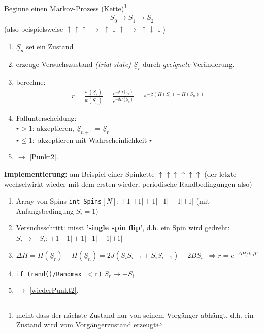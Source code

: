 \documentclass[12pt]{article}
\begin{document}
Beginne einen Markov-Prozess (Kette)\footnote{meint dass der nächste Zustand nur von seinem Vorgänger abhängt, d.h. ein Zustand wird vom Vorgängerzustand erzeugt} 
\begin{align*}
\underline{S}_0 \rightarrow \underline{S}_1 \rightarrow \underline{S}_2
\end{align*}
(also beispielsweise $\uparrow \uparrow \uparrow \; \rightarrow \; \uparrow \downarrow \uparrow \; \rightarrow \; \uparrow \downarrow \downarrow$)

\begin{enumerate}
\item $\underline{S}_n $ sei ein Zustand
\item \label{Punkt2} erzeuge Versuchszustand \textit{(trial state)} $\underline{S}_r$ durch \textit{geeignete} Veränderung.
\item berechne: 
\begin{align}
r= \frac{w(\underline{S}_r)}{w(\underline{S}_n)} = \frac{e^{- \beta H(\underline{S}_r )}}{e^{- \beta H(\underline{S}_n )}}= e^{-\beta (H(S_r)-H(S_n))}
\end{align}

\item Fallunterscheidung: \\ 
$r>1$: akzeptieren, $\underline{S}_{n+1} = \underline{S}_r$\\
$r \leq 1:$ akzeptieren mit Wahrscheinlichkeit $r$
\item  $\rightarrow$ \ref{Punkt2}.
\end{enumerate}
\textbf{Implementierung:} am Beispiel einer Spinkette $\uparrow \uparrow \uparrow \uparrow \uparrow \uparrow$ (der letzte wechselwirkt wieder mit dem ersten wieder, periodische Randbedingungen also)

\begin{enumerate}
\item Array von Spins \texttt{int Spins}$[N]$: $ +1|+1|+1|+1|+1|+1|$ (mit Anfangsbedingung $S_i =1$)
\item \label{wiederPunkt2} Versuchsschritt: misst \textbf{'single spin flip'}, d.h. ein Spin wird gedreht: \\
$S_i \rightarrow - S_i$: $ +1|-1|+1|+1|+1|+1|$
\item $\Delta H= H(\underline{S}_r)  - H(\underline{S}_n) = 2 J (S_i S_{i-1} + S_i S_{i+1}) + 2BS_i \; \; \Rightarrow r= e^{-\Delta H / k_BT}$
\item \texttt{if (rand()/Randmax $<$r)} $S_r \rightarrow -S_i$
\item $\rightarrow$ \ref{wiederPunkt2}.
\end{enumerate}
\end{document}
